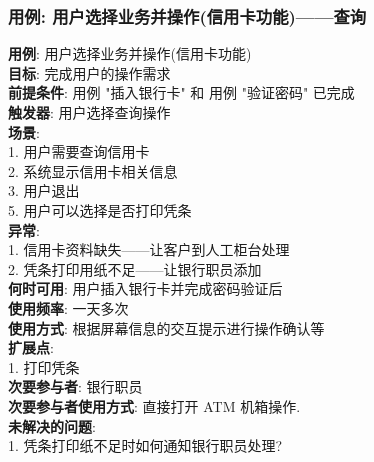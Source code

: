 \documentclass[UTF8]{article}
\begin{document}
\subsubsection{用例: 用户选择业务并操作(信用卡功能)——查询}
\noindent
\textbf{用例}: 用户选择业务并操作(信用卡功能)
\\
\textbf{目标}: 完成用户的操作需求
\\
\textbf{前提条件}: 用例 "插入银行卡" 和 用例 "验证密码" 已完成
\\
\textbf{触发器}: 用户选择查询操作
\\
\textbf{场景}: \\
	\hspace*{2em} 1. 用户需要查询信用卡 \\
	\hspace*{2em} 2. 系统显示信用卡相关信息 \\
	\hspace*{2em} 3. 用户退出 \\
	\hspace*{2em} 5. 用户可以选择是否打印凭条 \\
\textbf{异常}: \\
	\hspace*{2em} 1. 信用卡资料缺失——让客户到人工柜台处理 \\
	\hspace*{2em} 2. 凭条打印用纸不足——让银行职员添加 \\
\textbf{何时可用}: 用户插入银行卡并完成密码验证后
\\
\textbf{使用频率}: 一天多次
\\
\textbf{使用方式}: 根据屏幕信息的交互提示进行操作确认等 \\
\textbf{扩展点}: \\
	\hspace*{2em}1. 打印凭条 \\
\textbf{次要参与者}: 银行职员
\\
\textbf{次要参与者使用方式}: 直接打开 ATM 机箱操作.
\\
\textbf{未解决的问题}: \\
	\hspace*{2em} 1. 凭条打印纸不足时如何通知银行职员处理? \\
		
		
\end{document}
